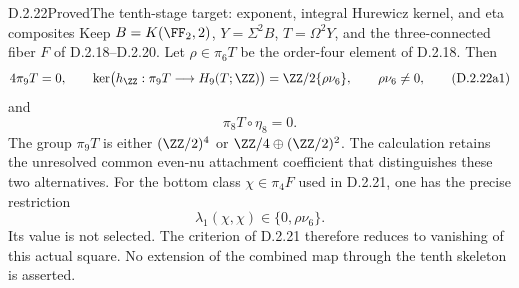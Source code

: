 \begin{claim}{D.2.22}{Proved}{The tenth-stage target: exponent, integral Hurewicz kernel, and eta composites}
Keep $B=K(\FF_2,2)$, $Y=\Sigma^2B$, $T=\Omega^2Y$, and the
three-connected fiber $F$ of \textup{D.2.18--D.2.20}.
Let $\rho\in\pi_6T$ be the order-four element of
\textup{D.2.18}. Then
\[
 4\pi_9T=0,\qquad
 \ker\bigl(h_{\ZZ}:\pi_9T\longrightarrow H_9(T;\ZZ)\bigr)
   =\ZZ/2\{\rho\nu_6\},\qquad \rho\nu_6\ne0,
 \tag{D.2.22a1}
\]
and
\[
 \pi_8T\circ\eta_8=0.
 \tag{D.2.22a2}
\]
The group $\pi_9T$ is either $(\ZZ/2)^4$ or
$\ZZ/4\oplus(\ZZ/2)^2$. The calculation retains the unresolved
common even-nu attachment coefficient that distinguishes these
two alternatives. For the bottom class $\chi\in\pi_4F$ used in
\textup{D.2.21}, one has the precise restriction
\[
 \lambda_1(\chi,\chi)\in\{0,\rho\nu_6\}.
 \tag{D.2.22a18}
\]
Its value is not selected. The criterion of \textup{D.2.21}
therefore reduces to vanishing of this actual square. No extension
of the combined map through the tenth skeleton is asserted.
\end{claim}
